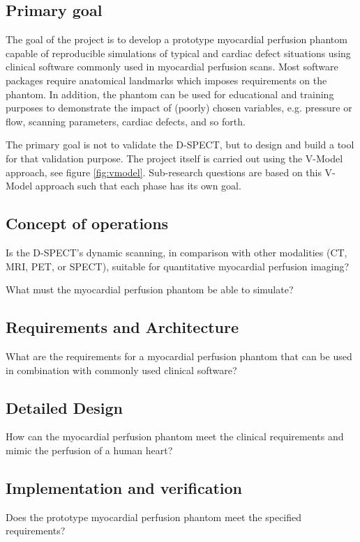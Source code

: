 \subsection{Primary goal}
The goal of the project is to develop a prototype myocardial perfusion phantom capable of reproducible simulations of typical and cardiac defect situations using clinical software commonly used in myocardial perfusion scans. Most software packages require anatomical landmarks which imposes requirements on the phantom. In addition, the phantom can be used for educational and training purposes to demonstrate the impact of (poorly) chosen variables, e.g. pressure or flow, scanning parameters, cardiac defects, and so forth.

The primary goal is not to validate the D-SPECT, but to design and build a tool for that validation purpose. The project itself is carried out using the V-Model \citep{rook1986controlling,osborne2005clarus} approach, see figure \ref{fig:vmodel}. Sub-research questions are based on this V-Model approach such that each phase has its own goal.

\subsection{Concept of operations}
Is the D-SPECT's dynamic scanning, in comparison with other modalities (CT, MRI, PET, or SPECT), suitable for quantitative myocardial perfusion imaging?

What must the myocardial perfusion phantom be able to simulate?

\subsection{Requirements and Architecture}
What are the requirements for a myocardial perfusion phantom that can be used in combination with commonly used clinical software?

\subsection{Detailed Design}
How can the myocardial perfusion phantom meet the clinical requirements and mimic the perfusion of a human heart?

\subsection{Implementation and verification}
Does the prototype myocardial perfusion phantom meet the specified requirements? 

